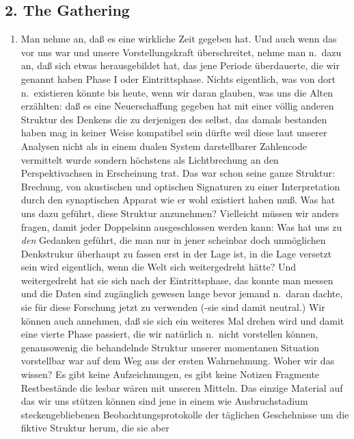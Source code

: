 \documentclass[
]{article}
\author{}
\date{\vspace{-2.5em}}
\providecommand{\tightlist}{%
  \setlength{\itemsep}{0pt}\setlength{\parskip}{0pt}}
\begin{document}
\subsection{2. The Gathering}\label{the-gathering}

\begin{enumerate}
\def\labelenumi{\alph{enumi}.}
\tightlist
\item
  Man nehme an, daß es eine wirkliche Zeit gegeben hat. Und auch wenn
  das vor uns war und unsere Vorstellungskraft überschreitet, nehme man
  n.~dazu an, daß sich etwas herausgebildet hat, das jene Periode
  überdauerte, die wir genannt haben Phase I oder Eintrittsphase. Nichts
  eigentlich, was von dort n.~existieren könnte bis heute, wenn wir
  daran glauben, was uns die Alten erzählten: daß es eine Neuerschaffung
  gegeben hat mit einer völlig anderen Struktur des Denkens die zu
  derjenigen des selbst, das damals bestanden haben mag in keiner Weise
  kompatibel sein dürfte weil diese laut unserer Analysen nicht als in
  einem dualen System darstellbarer Zahlencode vermittelt wurde sondern
  höchstens als Lichtbrechung an den Perspektivachsen in Erscheinung
  trat. Das war schon seine ganze Struktur: Brechung, von akustischen
  und optischen Signaturen zu einer Interpretation durch den
  synaptischen Apparat wie er wohl existiert haben muß. Was hat uns dazu
  geführt, diese Struktur anzunehmen? Vielleicht müssen wir anders
  fragen, damit jeder Doppelsinn ausgeschlossen werden kann: Was hat uns
  zu \emph{den} Gedanken geführt, die man nur in jener scheinbar doch
  unmöglichen Denkstrukur überhaupt zu fassen erst in der Lage ist, in
  die Lage versetzt sein wird eigentlich, wenn die Welt sich
  weitergedreht hätte? Und weitergedreht hat sie sich nach der
  Eintrittsphase, das konnte man messen und die Daten sind zugänglich
  gewesen lange bevor jemand n.~daran dachte, sie für diese Forschung
  jetzt zu verwenden (-sie sind damit neutral.) Wir können auch
  annehmen, daß sie sich ein weiteres Mal drehen wird und damit eine
  vierte Phase passiert, die wir natürlich n.~nicht vorstellen können,
  genausowenig die behandelnde Struktur unserer momentanen Situation
  vorstellbar war auf dem Weg aus der ersten Wahrnehmung. Woher wir das
  wissen? Es gibt keine Aufzeichnungen, es gibt keine Notizen Fragmente
  Restbestände die lesbar wären mit unseren Mitteln. Das einzige
  Material auf das wir uns stützen können sind jene in einem wie
  Ausbruchstadium steckengebliebenen Beobachtungsprotokolle der
  täglichen Geschehnisse um die fiktive Struktur herum, die sie aber

\end{enumerate}
\end{document}
